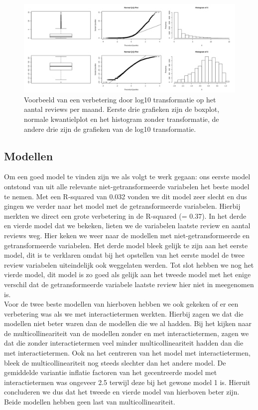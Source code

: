 \documentclass[a4paper,kulak]{kulakarticle} %
\begin{document}
\begin{figure}[H]
	\centering
	\includegraphics[width=\textwidth]{transformatieVb.jpeg}
	\caption{Voorbeeld van een verbetering door log10 transformatie op het aantal reviews per maand. Eerste drie grafieken zijn de boxplot, normale kwantielplot en het histogram zonder transformatie, de andere drie zijn de grafieken van de log10 transformatie.}
	\label{fig:transformVb}
\end{figure}

\subsection{Modellen}
Om een goed model te vinden zijn we als volgt te werk gegaan: ons eerste model ontstond van uit alle relevante niet-getransformeerde variabelen het beste model te nemen. Met een R-squared van 0.032 vonden we dit model zeer slecht en dus gingen we verder naar het model met de getransformeerde variabelen. Hierbij merkten we direct een grote verbetering in de R-squared (= 0.37). In het derde en vierde model dat we bekeken, lieten we de variabelen laatste review en aantal reviews weg. Hier keken we weer naar de modellen met niet-getransformeerde en getransformeerde variabelen. Het derde model bleek gelijk te zijn aan het eerste model, dit is te verklaren omdat bij het opstellen van het eerste model de twee review variabelen uiteindelijk ook weggelaten werden. Tot slot hebben we nog het vierde model, dit model is zo goed als gelijk aan het tweede model met het enige verschil dat de getransformeerde variabele laatste review hier niet in meegenomen is. \\

Voor de twee beste modellen van hierboven hebben we ook gekeken of er een verbetering was als we met interactietermen werkten. Hierbij zagen we dat die modellen niet beter waren dan de modellen die we al hadden. Bij het kijken naar de multicollineariteit van de modellen zonder en met interactietermen, zagen we dat die zonder interactietermen veel minder multicollineariteit hadden dan die met interactietermen. Ook na het centreren van het model met interactietermen, bleek de multicollineariteit nog steeds slechter dan het andere model. De gemiddelde variantie inflatie factoren van het gecentreerde model met interactietermen was ongeveer 2.5 terwijl deze bij het gewone model 1 is. Hieruit concluderen we dus dat het tweede en vierde model van hierboven beter zijn. Beide modellen hebben geen last van multicollineariteit.\\
\end{document}
